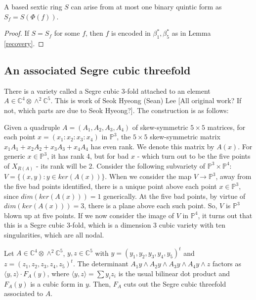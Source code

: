 \documentclass{article}
\begin{document}
\begin{corollary}
A based sextic ring $S$ can arise from at most one binary quintic form as $S_f = S(\Phi(f))$.
\end{corollary}
\begin{proof}
If $S = S_f$ for some $f$, then $f$ is encoded in $\beta_1^*, \beta_5^*$ as in Lemma \ref{recovery}.
\end{proof}

\subsection{An associated Segre cubic threefold}

There is a variety called a Segre cubic 3-fold attached to an element $A \in \mathbb{C}^4 \otimes \wedge^2 \mathbb{C}^5$.  This is work of Seok Hyeong (Sean) Lee [All original work?  If not, which parts are due to Seok Hyeong?].  The construction is as follows:

Given a quadruple $A = (A_1, A_2, A_3, A_4)$ of skew-symmetric $5 \times 5$ matrices, for each point $x = (x_1:x_2:x_3:x_4)$ in $\mathbb{P}^3$, the $5 \times 5$ skew-symmetric matrix $x_1 A_1 + x_2 A_2 + x_3 A_3 + x_4 A_4$ has even rank.  We denote this matrix by $A(x)$.  For generic $x \in \mathbb{P}^3$, it has rank 4, but for bad $x$ - which turn out to be the five points of $X_{R(A)}$ - its rank will be 2.  Consider the following subvariety of $\mathbb{P}^3 \times \mathbb{P}^4$: $V = \{ (x,y) : y \in ker(A(x)) \}$.  When we consider the map $V \to \mathbb{P}^3$, away from the five bad points identified, there is a unique point above each point $x \in \mathbb{P}^3$, since $dim(ker(A(x))) = 1$ generically.  At the five bad points, by virtue of $dim(ker(A(x))) = 3$, there is a plane above each such point.  So, $V$ is $\mathbb{P}^3$ blown up at five points.  If we now consider the image of $V$ in $\mathbb{P}^4$, it turns out that this is a Segre cubic 3-fold, which is a dimension 3 cubic variety with ten singularities, which are all nodal.

\begin{theorem} [S. H. Lee?] \label{segre equation}
Let $A \in \mathbb{C}^4 \otimes \wedge^2 \mathbb{C}^5$, $y,z \in \mathbb{C}^5$ with $y = (y_1, y_2, y_3, y_4, y_5)^t$ and $z = (z_1, z_2, z_3, z_4, z_5)^t$.  The determinant $A_1 y \wedge A_2 y \wedge A_3 y \wedge A_4 y \wedge z$ factors as $\langle y,z \rangle \cdot F_A(y)$, where $\langle y,z \rangle = \sum y_i z_i$ is the usual bilinear dot product and $F_A(y)$ is a cubic form in $y$.  Then, $F_A$ cuts out the Segre cubic threefold associated to $A$.
\end{theorem}
\end{document}
